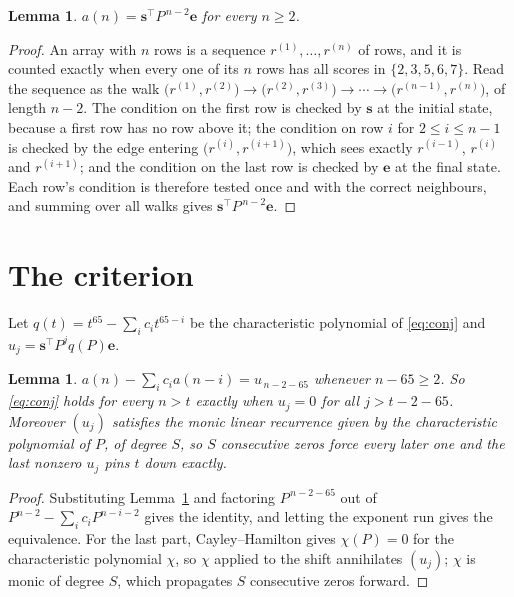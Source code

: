 \documentclass[11pt,a4paper]{article}
\theoremstyle{plain}
\newtheorem{lemma}[theorem]{Lemma}
\theoremstyle{definition}
\begin{document}
\begin{lemma}\label{lem:walk}
$a(n)=\mathbf{s}^{\!\top}P^{\,n-2}\mathbf{e}$ for every $n\ge2$.
\end{lemma}

\begin{proof}
An array with $n$ rows is a sequence $r^{(1)},\dots,r^{(n)}$ of rows, and it is counted
exactly when every one of its $n$ rows has all scores in $\{2,3,5,6,7\}$. Read the sequence as the
walk $\bigl(r^{(1)},r^{(2)}\bigr)\to\bigl(r^{(2)},r^{(3)}\bigr)\to\cdots\to
\bigl(r^{(n-1)},r^{(n)}\bigr)$, of length $n-2$. The condition on the first row is
checked by $\mathbf{s}$ at the initial state, because a first row has no row above it; the
condition on row $i$ for $2\le i\le n-1$ is checked by the edge entering
$\bigl(r^{(i)},r^{(i+1)}\bigr)$, which sees exactly $r^{(i-1)}$, $r^{(i)}$ and
$r^{(i+1)}$; and the condition on the last row is checked by $\mathbf{e}$ at the final
state. Each row's condition is therefore tested once and with the correct neighbours, and
summing over all walks gives $\mathbf{s}^{\!\top}P^{\,n-2}\mathbf{e}$.
\end{proof}

\section{The criterion}

Let $q(t)=t^{65}-\sum_i c_i t^{65-i}$ be the characteristic polynomial of
\eqref{eq:conj} and $u_j=\mathbf{s}^{\!\top}P^{j}q(P)\mathbf{e}$.

\begin{lemma}\label{lem:crit}
$a(n)-\sum_i c_i a(n-i)=u_{\,n-2-65}$ whenever $n-65\ge2$. So \eqref{eq:conj}
holds for every $n>t$ exactly when $u_j=0$ for all $j>t-2-65$. Moreover $(u_j)$
satisfies the monic linear recurrence given by the characteristic polynomial of $P$, of
degree $S$, so $S$ consecutive zeros force every later one and the last nonzero $u_j$ pins
$t$ down exactly.
\end{lemma}

\begin{proof}
Substituting Lemma~\ref{lem:walk} and factoring $P^{\,n-2-65}$ out of
$P^{n-2}-\sum_i c_i P^{n-i-2}$ gives the identity, and letting the exponent run gives the
equivalence. For the last part, Cayley--Hamilton gives $\chi(P)=0$ for the characteristic
polynomial $\chi$, so $\chi$ applied to the shift annihilates $(u_j)$; $\chi$ is monic of
degree $S$, which propagates $S$ consecutive zeros forward.
\end{proof}
\end{document}
